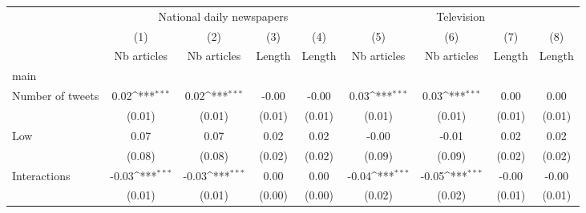 {
\def\sym#1{\ifmmode^{#1}\else\(^{#1}\)\fi}
\begin{tabular}{l*{8}{c}}
\hline\hline
                    &\multicolumn{4}{c}{National daily newspapers}                                          &\multicolumn{4}{c}{Television}                                                         \\\cmidrule(lr){2-5}\cmidrule(lr){6-9}
                    &\multicolumn{1}{c}{(1)}&\multicolumn{1}{c}{(2)}&\multicolumn{1}{c}{(3)}&\multicolumn{1}{c}{(4)}&\multicolumn{1}{c}{(5)}&\multicolumn{1}{c}{(6)}&\multicolumn{1}{c}{(7)}&\multicolumn{1}{c}{(8)}\\
                    &\multicolumn{1}{c}{Nb articles}&\multicolumn{1}{c}{Nb articles}&\multicolumn{1}{c}{Length}&\multicolumn{1}{c}{Length}&\multicolumn{1}{c}{Nb articles}&\multicolumn{1}{c}{Nb articles}&\multicolumn{1}{c}{Length}&\multicolumn{1}{c}{Length}\\
\hline
main                &                     &                     &                     &                     &                     &                     &                     &                     \\
Number of tweets    &        0.02\sym{***}&        0.02\sym{***}&       -0.00         &       -0.00         &        0.03\sym{***}&        0.03\sym{***}&        0.00         &        0.00         \\
                    &      (0.01)         &      (0.01)         &      (0.01)         &      (0.01)         &      (0.01)         &      (0.01)         &      (0.01)         &      (0.01)         \\
Low                 &        0.07         &        0.07         &        0.02         &        0.02         &       -0.00         &       -0.01         &        0.02         &        0.02         \\
                    &      (0.08)         &      (0.08)         &      (0.02)         &      (0.02)         &      (0.09)         &      (0.09)         &      (0.02)         &      (0.02)         \\
Interactions        &       -0.03\sym{***}&       -0.03\sym{***}&        0.00         &        0.00         &       -0.04\sym{***}&       -0.05\sym{***}&       -0.00         &       -0.00         \\
                    &      (0.01)         &      (0.01)         &      (0.00)         &      (0.00)         &      (0.02)         &      (0.02)         &      (0.01)         &      (0.01)         \\

\end{tabular}}

